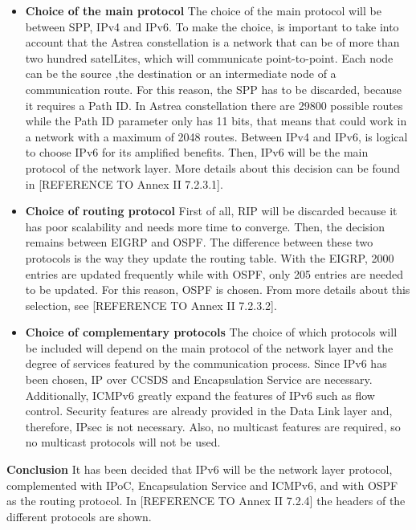 \begin{itemize}
\item \textbf{Choice of the main protocol}
The choice of the main protocol will be between SPP, IPv4 and IPv6. To make the choice, is important to take into account that the Astrea constellation is a network that can be of more than two hundred satelLites, which will communicate point-to-point. Each node can be the source ,the destination or an intermediate node of a communication route.
For this reason, the SPP has to be discarded, because it requires a Path ID. In Astrea constellation there are 29800 possible routes while the Path ID parameter only has 11 bits, that means that could work in a network with a maximum of 2048 routes. Between IPv4 and IPv6, is logical to choose IPv6 for its amplified benefits. Then, IPv6 will be the main protocol of the network layer. More details about this decision can be found in [REFERENCE TO Annex II 7.2.3.1]. 
\item \textbf{Choice of routing protocol}
First of all, RIP will be discarded because it has poor scalability and needs more time to converge. Then, the decision remains between EIGRP and OSPF. The difference between these two protocols is the way they update the routing table. With the EIGRP, 2000 entries are updated frequently while with OSPF, only 205 entries are needed to be updated. For this reason, OSPF is chosen. From more details about this selection, see [REFERENCE TO Annex II 7.2.3.2].
\item \textbf{Choice of complementary protocols}
The choice of which protocols will be included will depend on the main protocol of the network layer and the degree of services featured by the communication process.
Since IPv6 has been chosen, IP over CCSDS and Encapsulation Service are necessary. Additionally, ICMPv6 greatly expand the features of IPv6 such as flow control. Security features are already provided in the Data Link layer and, therefore, IPsec is not necessary. Also, no multicast features are required, so no multicast protocols will not be used.
\end{itemize}

\textbf{Conclusion}
It has been decided that IPv6 will be the network layer protocol, complemented with IPoC, Encapsulation Service and ICMPv6, and with OSPF as the routing protocol. In [REFERENCE TO Annex II 7.2.4] the headers of the different protocols are shown. 